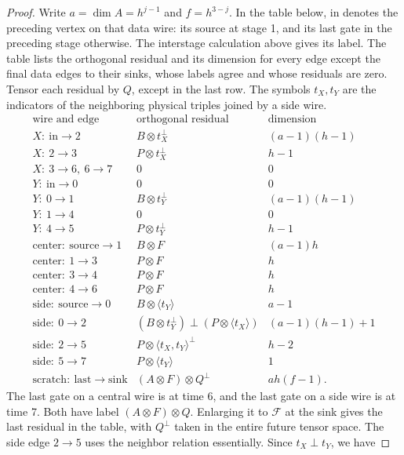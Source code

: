 \begin{proof}
Write $a=\dim A=h^{j-1}$ and $f=h^{3-j}$.  In the table below,
$\mathrm{in}$ denotes the preceding vertex on that data wire: its source
at stage 1, and its last gate in the preceding stage otherwise.  The
interstage calculation above gives its label.  The table lists the
orthogonal residual and its dimension for every edge except the final
data edges to their sinks, whose labels agree and whose residuals are zero.
Tensor each residual by $Q$, except in the last row.  The symbols $t_X,t_Y$ are
the indicators of the neighboring physical triples joined by a side wire.
\[
\begin{array}{l|l|r}
\text{wire and edge}&\text{orthogonal residual}&\text{dimension}\\ \hline
X:\ \mathrm{in}\to2&B\otimes t_X^\perp&(a-1)(h-1)\\
X:\ 2\to3&P\otimes t_X^\perp&h-1\\
X:\ 3\to6,\ 6\to7&0&0\\
Y:\ \mathrm{in}\to0&0&0\\
Y:\ 0\to1&B\otimes t_Y^\perp&(a-1)(h-1)\\
Y:\ 1\to4&0&0\\
Y:\ 4\to5&P\otimes t_Y^\perp&h-1\\
\mathrm{center}:\ \mathrm{source}\to1&B\otimes F&(a-1)h\\
\mathrm{center}:\ 1\to3&P\otimes F&h\\
\mathrm{center}:\ 3\to4&P\otimes F&h\\
\mathrm{center}:\ 4\to6&P\otimes F&h\\
\mathrm{side}:\ \mathrm{source}\to0&B\otimes\langle t_Y\rangle&a-1\\
\mathrm{side}:\ 0\to2&(B\otimes t_Y^\perp)\mathbin{\perp}(P\otimes\langle t_X\rangle)
 &(a-1)(h-1)+1\\
\mathrm{side}:\ 2\to5&P\otimes\langle t_X,t_Y\rangle^\perp&h-2\\
\mathrm{side}:\ 5\to7&P\otimes\langle t_Y\rangle&1\\
\mathrm{scratch}:\ \mathrm{last}\to\mathrm{sink}
 &(A\otimes F)\otimes Q^\perp&ah(f-1).
\end{array}
\]
The last gate on a central wire is at time 6, and the last gate on a side
wire is at time 7.  Both have label $(A\otimes F)\otimes Q$.  Enlarging it
to $\mathcal F$ at the sink gives the last residual in the table, with
$Q^\perp$ taken in the entire future tensor space.
The side edge $2\to5$ uses the neighbor relation
essentially.  Since $t_X\perp t_Y$, we have

\end{proof}
